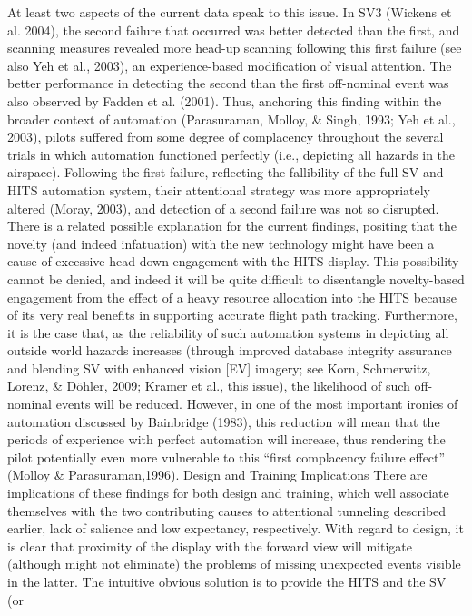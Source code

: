 \documentclass[utf8,bachelor,manualbib]{gradu3}
\begin{document}
At least two aspects of the current data speak to this issue. In SV3 (Wickens et
al. 2004), the second failure that occurred was better detected than the first, and
scanning measures revealed more head-up scanning following this first failure (see
also Yeh et al., 2003), an experience-based modification of visual attention. The
better performance in detecting the second than the first off-nominal event was
also observed by Fadden et al. (2001). Thus, anchoring this finding within the
broader context of automation (Parasuraman, Molloy, \& Singh, 1993; Yeh et al.,
2003), pilots suffered from some degree of complacency throughout the several trials
in which automation functioned perfectly (i.e., depicting all hazards in the
airspace). Following the first failure, reflecting the fallibility of the full SV and
HITS automation system, their attentional strategy was more appropriately altered
(Moray, 2003), and detection of a second failure was not so disrupted.
There is a related possible explanation for the current findings, positing that the
novelty (and indeed infatuation) with the new technology might have been a cause
of excessive head-down engagement with the HITS display. This possibility cannot
be denied, and indeed it will be quite difficult to disentangle novelty-based engagement
from the effect of a heavy resource allocation into the HITS because of its very
real benefits in supporting accurate flight path tracking. Furthermore, it is the case
that, as the reliability of such automation systems in depicting all outside world hazards
increases (through improved database integrity assurance and blending SV with
enhanced vision [EV] imagery; see Korn, Schmerwitz, Lorenz, \& Döhler, 2009;
Kramer et al., this issue), the likelihood of such off-nominal events will be reduced.
However, in one of the most important ironies of automation discussed by Bainbridge
(1983), this reduction will mean that the periods of experience with perfect
automation will increase, thus rendering the pilot potentially even more vulnerable
to this “first complacency failure effect” (Molloy \& Parasuraman,1996).
Design and Training Implications
There are implications of these findings for both design and training, which well
associate themselves with the two contributing causes to attentional tunneling described
earlier, lack of salience and low expectancy, respectively. With regard to
design, it is clear that proximity of the display with the forward view will mitigate
(although might not eliminate) the problems of missing unexpected events visible in the latter. The intuitive obvious solution is to provide the HITS and the SV (or
\end{document}
